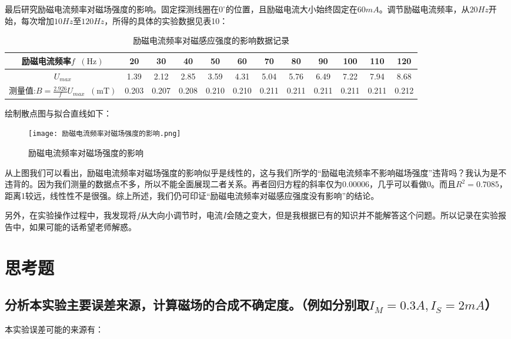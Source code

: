 \documentclass[11pt]{article}
\newcommand*{\unit}[1]{\mathop{}\!\mathrm{#1}}
\begin{document}
最后研究励磁电流频率对磁场强度的影响。固定探测线圈在$0^\circ$的位置，且励磁电流大小始终固定在$60mA$。调节励磁电流频率，从$20Hz$开始，每次增加$10Hz$至$120Hz$，所得的具体的实验数据见表10：

\begin{table}[H]
  \centering
  \caption{励磁电流频率对磁感应强度的影响数据记录}
  \begin{tabular}{|c|c|c|c|c|c|c|c|c|c|c|c|}
      \hline
      励磁电流频率$f\unit{(Hz)}$&20&30&40&50&60&70&80&90&100&110&120\\
      \hline
      $U_{max}$&1.39  & 2.12  & 2.85  & 3.59  & 4.31  & 5.04  & 5.76  & 6.49  & 7.22  & 7.94  & 8.68\\
      \hline
      测量值:$B = \frac{2.926}{f} U_{max} \unit{(mT)}$&0.203  & 0.207  & 0.208  & 0.210  & 0.210  & 0.211  & 0.211  & 0.211  & 0.211  & 0.211  & 0.212  \\
      \hline
  \end{tabular}
\end{table}

绘制散点图与拟合直线如下：

\begin{figure}[H]
  \centering
  \texttt{[image: 励磁电流频率对磁场强度的影响.png]}
  \caption{励磁电流频率对磁场强度的影响}
\end{figure}

从上图我们可以看出，励磁电流频率对磁场强度的影响似乎是线性的，这与我们所学的“励磁电流频率不影响磁场强度”违背吗？我认为是不违背的。因为我们测量的数据点不多，所以不能全面展现二者关系。再者回归方程的斜率仅为$0.00006$，几乎可以看做0。而且$R^2 = 0.7085$，距离1较远，线性性不是很强。综上所述，我们仍可印证“励磁电流频率对磁感应强度没有影响”的结论。

另外，在实验操作过程中，我发现将$f$从大向小调节时，电流$I$会随之变大，但是我根据已有的知识并不能解答这个问题。所以记录在实验报告中，如果可能的话希望老师解惑。

\section{思考题}

\subsection{分析本实验主要误差来源，计算磁场的合成不确定度。（例如分别取$I_M = 0.3A, I_S = 2mA$）}

本实验误差可能的来源有：
\end{document}
